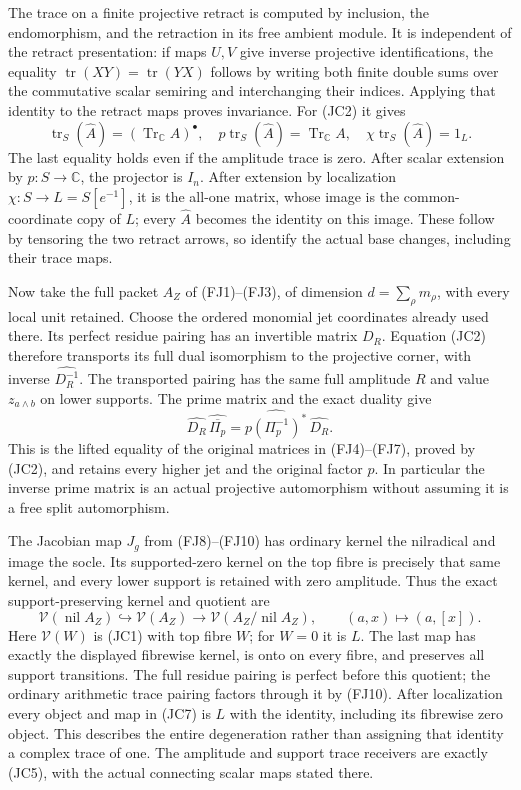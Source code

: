 The trace on a finite projective retract is computed by inclusion,
the endomorphism, and the retraction in its free ambient module.
It is independent of the retract presentation: if maps $U,V$ give
inverse projective identifications, the equality
$\operatorname{tr}(XY)=\operatorname{tr}(YX)$ follows by writing
both finite double sums over the commutative scalar semiring and
interchanging their indices. Applying that identity to the retract
maps proves invariance. For (JC2) it gives
\[
 \operatorname{tr}_S(\widehat A)
       =(\operatorname{Tr}_{\mathbb C}A)^\bullet,
 \quad
 p\operatorname{tr}_S(\widehat A)=\operatorname{Tr}_{\mathbb C}A,
 \quad
 \chi\operatorname{tr}_S(\widehat A)=1_L.
 \tag{JC5}
\]
The last equality holds even if the amplitude trace is zero.
After scalar extension by $p:S\to\mathbb C$, the projector is
$I_n$. After extension by localization $\chi:S\to L=S[e^{-1}]$,
it is the all-one matrix, whose image is the common-coordinate
copy of $L$; every $\widehat A$ becomes the identity on this image.
These follow by tensoring the two retract arrows, so identify the
actual base changes, including their trace maps.

Now take the full packet $A_Z$ of (FJ1)--(FJ3), of dimension
$d=\sum_\rho m_\rho$, with every local unit retained. Choose the
ordered monomial jet coordinates already used there. Its perfect
residue pairing has an invertible matrix $D_R$. Equation (JC2)
therefore transports its full dual isomorphism to the projective
corner, with inverse $\widehat{D_R^{-1}}$. The transported pairing
has the same full amplitude $R$ and value $z_{a\wedge b}$ on
lower supports. The prime matrix and the exact duality give
\[
 \widehat{D_R}\,\widehat{\overline{\Pi_p}}
  =\widehat{p(\Pi_p^{-1})^*}\,\widehat{D_R}.
 \tag{JC6}
\]
This is the lifted equality of the original matrices in (FJ4)--(FJ7),
proved by (JC2), and retains every higher jet and the original factor
$p$. In particular the inverse prime matrix is an actual projective
automorphism without assuming it is a free split automorphism.

The Jacobian map $J_g$ from (FJ8)--(FJ10) has ordinary kernel the
nilradical and image the socle. Its supported-zero kernel on the
top fibre is precisely that same kernel, and every lower support
is retained with zero amplitude. Thus the exact support-preserving
kernel and quotient are
\[
 \mathcal V(\operatorname{nil}A_Z)\hookrightarrow\mathcal V(A_Z)
 \longrightarrow\mathcal V(A_Z/\operatorname{nil}A_Z),
 \qquad (a,x)\longmapsto(a,[x]).
 \tag{JC7}
\]
Here $\mathcal V(W)$ is (JC1) with top fibre $W$; for $W=0$
it is $L$. The last map has exactly the displayed fibrewise kernel,
is onto on every fibre, and preserves all support transitions.
The full residue pairing is perfect before this quotient; the
ordinary arithmetic trace pairing factors through it by (FJ10).
After localization every object and map in (JC7) is $L$ with the
identity, including its fibrewise zero object. This describes the
entire degeneration rather than assigning that identity a complex
trace of one. The amplitude and support trace receivers are exactly
(JC5), with the actual connecting scalar maps stated there.
